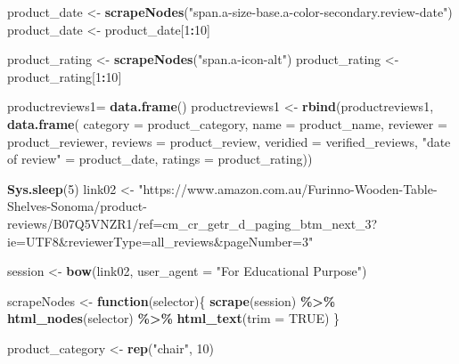 \documentclass[
]{article}
\newenvironment{Shaded}{\begin{snugshade}}{\end{snugshade}}
\newcommand{\AttributeTok}[1]{\textcolor[rgb]{0.13,0.29,0.53}{#1}}
\newcommand{\ConstantTok}[1]{\textcolor[rgb]{0.56,0.35,0.01}{#1}}
\newcommand{\ControlFlowTok}[1]{\textcolor[rgb]{0.13,0.29,0.53}{\textbf{#1}}}
\newcommand{\DecValTok}[1]{\textcolor[rgb]{0.00,0.00,0.81}{#1}}
\newcommand{\FunctionTok}[1]{\textcolor[rgb]{0.13,0.29,0.53}{\textbf{#1}}}
\newcommand{\NormalTok}[1]{#1}
\newcommand{\OtherTok}[1]{\textcolor[rgb]{0.56,0.35,0.01}{#1}}
\newcommand{\SpecialCharTok}[1]{\textcolor[rgb]{0.81,0.36,0.00}{\textbf{#1}}}
\newcommand{\StringTok}[1]{\textcolor[rgb]{0.31,0.60,0.02}{#1}}
\begin{document}
\begin{Shaded}
\begin{Highlighting}[]
\NormalTok{  product\_date }\OtherTok{\textless{}{-}} \FunctionTok{scrapeNodes}\NormalTok{(}\StringTok{"span.a{-}size{-}base.a{-}color{-}secondary.review{-}date"}\NormalTok{)}
\NormalTok{  product\_date }\OtherTok{\textless{}{-}}\NormalTok{ product\_date[}\DecValTok{1}\SpecialCharTok{:}\DecValTok{10}\NormalTok{]}
  
\NormalTok{  product\_rating }\OtherTok{\textless{}{-}} \FunctionTok{scrapeNodes}\NormalTok{(}\StringTok{"span.a{-}icon{-}alt"}\NormalTok{)}
\NormalTok{  product\_rating }\OtherTok{\textless{}{-}}\NormalTok{ product\_rating[}\DecValTok{1}\SpecialCharTok{:}\DecValTok{10}\NormalTok{]}
  
\NormalTok{  productreviews1}\OtherTok{=} \FunctionTok{data.frame}\NormalTok{()}
\NormalTok{  productreviews1 }\OtherTok{\textless{}{-}} \FunctionTok{rbind}\NormalTok{(productreviews1, }\FunctionTok{data.frame}\NormalTok{(}
                      \AttributeTok{category =}\NormalTok{ product\_category,}
                      \AttributeTok{name =}\NormalTok{ product\_name,}
                      \AttributeTok{reviewer =}\NormalTok{ product\_reviewer,}
                      \AttributeTok{reviews =}\NormalTok{ product\_review,}
                      \AttributeTok{veridied =}\NormalTok{ verified\_reviews,}
                      \StringTok{"date of review"} \OtherTok{=}\NormalTok{ product\_date,}
                      \AttributeTok{ratings =}\NormalTok{ product\_rating))}

  
 \FunctionTok{Sys.sleep}\NormalTok{(}\DecValTok{5}\NormalTok{)}
\NormalTok{link02 }\OtherTok{\textless{}{-}} \StringTok{"https://www.amazon.com.au/Furinno{-}Wooden{-}Table{-}Shelves{-}Sonoma/product{-}reviews/B07Q5VNZR1/ref=cm\_cr\_getr\_d\_paging\_btm\_next\_3?ie=UTF8\&reviewerType=all\_reviews\&pageNumber=3"}


\NormalTok{  session }\OtherTok{\textless{}{-}} \FunctionTok{bow}\NormalTok{(link02,}
               \AttributeTok{user\_agent =} \StringTok{"For Educational Purpose"}\NormalTok{)}

\NormalTok{  scrapeNodes }\OtherTok{\textless{}{-}} \ControlFlowTok{function}\NormalTok{(selector)\{}
    \FunctionTok{scrape}\NormalTok{(session) }\SpecialCharTok{\%\textgreater{}\%}
      \FunctionTok{html\_nodes}\NormalTok{(selector) }\SpecialCharTok{\%\textgreater{}\%}
      \FunctionTok{html\_text}\NormalTok{(}\AttributeTok{trim =} \ConstantTok{TRUE}\NormalTok{)}
\NormalTok{  \}}

\NormalTok{  product\_category }\OtherTok{\textless{}{-}} \FunctionTok{rep}\NormalTok{(}\StringTok{"chair"}\NormalTok{, }\DecValTok{10}\NormalTok{)}


\end{Highlighting}
\end{Shaded}
\end{document}
